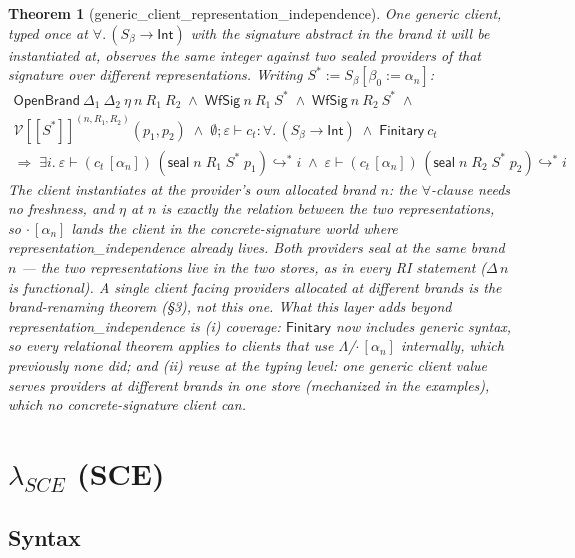 \documentclass[10pt]{article}
\newtheorem{theorem}{Theorem}[section]
\newcommand{\Int}{\mathsf{Int}}
\newcommand{\tp}{\varepsilon}
\newcommand{\bra}[1]{\alpha_{#1}}
\newcommand{\subs}[3]{#1[#2{:=}#3]}
\newcommand{\sealE}[4]{\mathsf{seal}\;#1\;#2\;#3\;#4}
\newcommand{\msteps}[3]{#1 \vdash #2 \hookrightarrow^{*} #3}
\newcommand{\hast}[4]{#1; #2 \vdash #3 : #4}
\newcommand{\sT}[1]{[\![#1]\!]}
\newcommand{\LRg}[2]{\mathcal{V}\sT{#2}^{#1}}
\newcommand{\bv}[1]{\beta_{#1}}
\newcommand{\allb}[1]{\forall.\,#1}
\newcommand{\bapp}[2]{#1\,[\bra{#2}]}
\begin{document}
\begin{theorem}[\textsf{generic\_client\_representation\_independence}]
One \emph{generic} client, typed once at $\allb{(S_\beta \to \Int)}$ with the signature
abstract in the brand it will be instantiated at, observes the same integer against two
sealed providers of that signature over different representations.  Writing
$S^{*} := \subs{S_\beta}{\bv{0}}{\bra{n}}$:
\[
\begin{array}{l}
\mathsf{OpenBrand}\ \Delta_1\ \Delta_2\ \eta\ n\ R_1\ R_2 \;\wedge\;
\mathsf{WfSig}\ n\ R_1\ S^{*} \;\wedge\; \mathsf{WfSig}\ n\ R_2\ S^{*} \;\wedge \\
\LRg{(n,R_1,R_2)}{S^{*}}(p_1,p_2) \;\wedge\;
\hast{\emptyset}{\tp}{c_t}{\allb{(S_\beta \to \Int)}} \;\wedge\; \mathsf{Finitary}\ c_t \\
\Longrightarrow\;
\exists i.\ \msteps{\tp}{(\bapp{c_t}{n})\,(\sealE{n}{R_1}{S^{*}}{p_1})}{i} \;\wedge\;
\msteps{\tp}{(\bapp{c_t}{n})\,(\sealE{n}{R_2}{S^{*}}{p_2})}{i}
\end{array}
\]
The client instantiates at the provider's \emph{own} allocated brand $n$: the
$\forall$-clause needs no freshness, and $\eta$ at $n$ is exactly the relation between
the two representations, so $\bapp{\cdot}{n}$ lands the client in the
concrete-signature world where \textsf{representation\_independence} already lives.
Both providers seal at the \emph{same} brand $n$ — the two representations live in the
two stores, as in every RI statement ($\Delta\,n$ is functional).  A single client
facing providers allocated at \emph{different} brands is the brand-renaming theorem
(\S3), not this one.  What this layer adds beyond
\textsf{representation\_independence} is (i) coverage: $\mathsf{Finitary}$ now
includes generic syntax, so \emph{every} relational theorem applies to clients that
use $\Lambda$/$\bapp{\cdot}{n}$ internally, which previously none did; and (ii) reuse
at the typing level: one generic client value serves providers at different brands in
one store (mechanized in the examples), which no concrete-signature client can.
\end{theorem}

\section{$\lambda_{SCE}$ (SCE)}

\subsection{Syntax}
\end{document}
